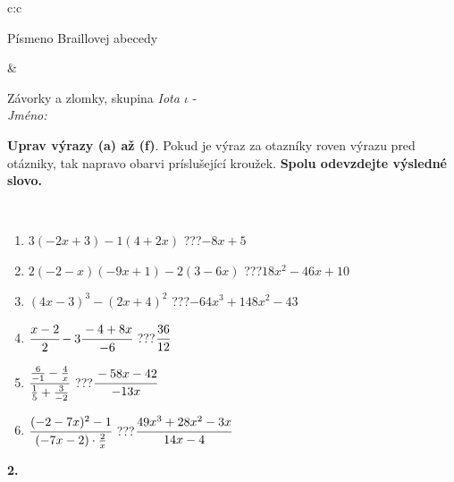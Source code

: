 \documentclass[10pt]{report}
\begin{document}
\begin{tabular}{c:c}
\begin{minipage}[c][104.5mm][t]{0.5\linewidth}
\begin{center}
\begin{minipage}{0.20\linewidth}
\begin{center}
{\small Písmeno Braillovej abecedy}
\end{center}
\end{minipage}
\end{center}
\end{minipage}
&
\begin{minipage}[c][104.5mm][t]{0.5\linewidth}
\begin{center}
\vspace{7mm}
{\huge Závorky a zlomky, skupina \textit{Iota $\iota$} -}\\[5mm]
\textit{Jméno:}\phantom{xxxxxxxxxxxxxxxxxxxxxxxxxxxxxxxxxxxxxxxxxxxxxxxxxxxxxxxxxxxxxxxxx}\\[5mm]
\begin{minipage}{0.95\linewidth}
\begin{center}
\textbf{Uprav výrazy (a) až (f)}. Pokud je výraz za otazníky roven výrazu pred otázniky, tak napravo obarvi príslušející kroužek. \textbf{Spolu odevzdejte výsledné slovo.}
\end{center}
\end{minipage}
\\[1mm]
\begin{minipage}{0.79\linewidth}
\begin{center}
\begin{varwidth}{\linewidth}
\begin{enumerate}
\normalsize
\item $3(-2x+3)-1(4+2x)$\quad \dotfill\; ???\;\dotfill \quad $-8x+5$
\item $2(-2-x)(-9x+1)-2(3-6x)$\quad \dotfill\; ???\;\dotfill \quad $18x^2-46x+10$
\item $(4x-3)^3-(2x+4)^2$\quad \dotfill\; ???\;\dotfill \quad $-64x^3+148x^2-43$
\item $\cfrac{x-2}{2}-3\cfrac{-4+8x}{-6}$\quad \dotfill\; ???\;\dotfill \quad $\cfrac{36}{12}$
\item $\cfrac{\frac{6}{-1}-\frac{4}{x}}{\frac{1}{5}+\frac{3}{-2}}$\quad \dotfill\; ???\;\dotfill \quad $\cfrac{-58x-42}{-13x}$
\item $\cfrac{(-2-7x)^2-1}{(-7x-2)\cdot\frac{2}{x}}$\quad \dotfill\; ???\;\dotfill \quad $\cfrac{49x^3+28x^2-3x}{14x-4}$
\end{enumerate}
\end{varwidth}
\end{center}
\end{minipage}
\begin{minipage}{0.20\linewidth}
\begin{center}
{\Huge\bfseries 2.} \\[2mm]

\end{center}
\end{minipage}
\end{center}
\end{minipage}
\end{tabular}
\end{document}
